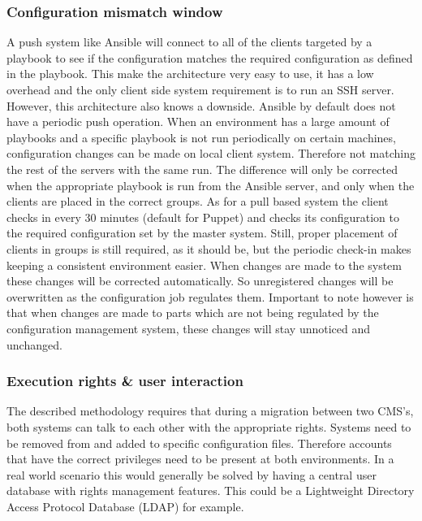 \subsubsection{Configuration mismatch window}
A push system like Ansible will connect to all of the clients targeted by a playbook to see if the configuration matches the required configuration as defined in the playbook. This make the architecture very easy to use, it has a low overhead and the only client side system requirement is to run an SSH server. However, this architecture also knows a downside. Ansible by default does not have a periodic push operation. When an environment has a large amount of playbooks and a specific playbook is not run periodically on certain machines, configuration changes can be made on local client system. Therefore not matching the rest of the servers with the same run. The difference will only be corrected when the appropriate playbook is run from the Ansible server, and only when the clients are placed in the correct groups. As for a pull based system the client checks in every 30 minutes (default for Puppet) and checks its configuration to the required configuration set by the master system. Still, proper placement of clients in groups is still required, as it should be, but the periodic check-in makes keeping a consistent environment easier. When changes are made to the system these changes will be corrected automatically. So unregistered changes will be overwritten as the configuration job regulates them. Important to note however is that when changes are made to parts which are not being regulated by the configuration management system, these changes will stay unnoticed and unchanged.

\subsubsection{Execution rights \& user interaction}
The described methodology requires that during a migration between two CMS's, both systems can talk to each other with the appropriate rights. Systems need to be removed from and added to specific configuration files. Therefore accounts that have the correct privileges need to be present at both environments. In a real world scenario this would generally be solved by having a central user database with rights management features. This could be a Lightweight Directory Access Protocol Database (LDAP) for example. 

